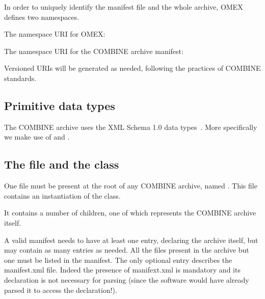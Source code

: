 In order to uniquely identify the manifest file and the whole archive, OMEX defines two namespaces.

The namespace URI for OMEX: 

\begin{quote}
\end{quote}

The namespace URI for the COMBINE archive manifest: 

\begin{quote}
\end{quote}

Versioned URIs will be generated as needed, following the practices of COMBINE standards.


\subsection{Primitive data types}
\label{primtypes}

The COMBINE archive uses the XML Schema 1.0 data types~\citep{biron:2000}.
More specifically we make use of  and .

\subsection{The  file and the  class}
\label{manifest-class}

One file must be present at the root of any COMBINE archive, named . This file contains an instantiation of the \OmexManifest class. 

It contains a number of \Content children, one of which represents the COMBINE archive itself. 

A valid manifest needs to have at least one entry, declaring the archive itself, but may 
contain as many entries as needed. All the files present in the archive but one must be listed in the manifest. The only optional entry describes the manifest.xml file. Indeed the presence of manifext.xml is mandatory and its declaration is not necessary for parsing (since the software would have already parsed it to access the declaration!).

